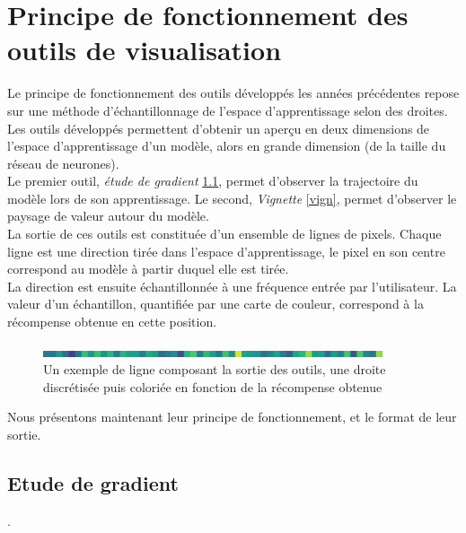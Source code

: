\documentclass[12pt]{article}
\begin{document}
\section{Principe de fonctionnement des outils de visualisation}

Le principe de fonctionnement des outils développés les années précédentes repose sur une méthode d’échantillonnage de l’espace d’apprentissage selon des droites. \\

Les outils développés permettent d'obtenir un aperçu en deux dimensions de l'espace d'apprentissage d'un modèle, alors en grande dimension (de la taille du réseau de neurones). \\

Le premier outil, \emph{étude de gradient} \ref{gradient}, permet d'observer la trajectoire du modèle lors de son apprentissage. Le second, \emph{Vignette} \ref{vign}, permet d'observer le paysage de valeur autour du modèle. \\

La sortie de ces outils est constituée d’un ensemble de lignes de pixels. Chaque ligne est une direction tirée dans l’espace d’apprentissage, le pixel en son centre correspond au modèle à partir duquel elle est tirée. \\

La direction est ensuite échantillonnée à une fréquence entrée par l’utilisateur. La valeur d'un échantillon, quantifiée par une carte de couleur, correspond à la récompense obtenue en cette position. \\

\begin{figure}[htp]
    \centering
    \includegraphics[width=10cm]{Images/Ligne}
    \caption{Un exemple de ligne composant la sortie des outils, une droite discrétisée puis coloriée en fonction de la récompense obtenue}
    \label{fig:ligne1}
\end{figure}

Nous présentons maintenant leur principe de fonctionnement, et le format de leur sortie. \\

\subsection{Etude de gradient} \label{gradient}.
\end{document}
